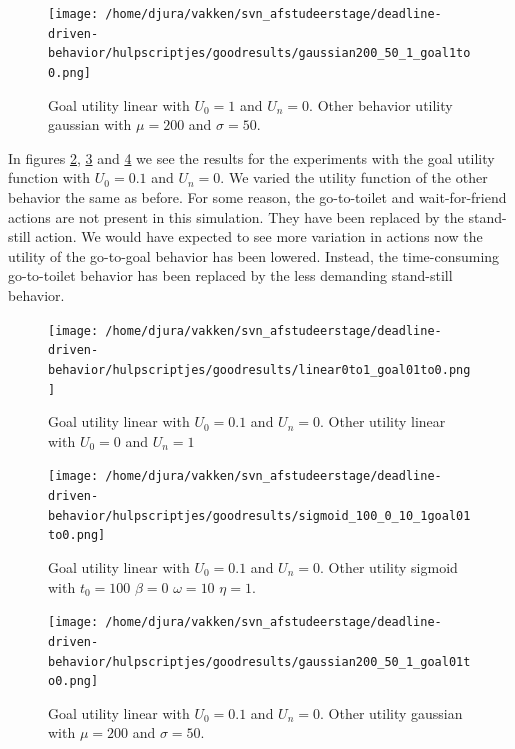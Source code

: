 \documentclass[11pt]{book}
\begin{document}
\begin{figure}[b]
\texttt{[image: /home/djura/vakken/svn\_afstudeerstage/deadline-driven-behavior/hulpscriptjes/goodresults/gaussian200\_50\_1\_goal1to0.png]}
\caption{Goal utility linear with $U_0=1$ and $U_n = 0$. Other behavior utility gaussian with $\mu=200$ and $\sigma=50$.}
\label{fig:gaussian200_50_1_goal1to0}
\end{figure}



In figures \ref{fig:linear0to1_goal01to0}, \ref{fig:sigmoid_100_0_10_1goal01to0} and \ref{fig:gaussian200_50_1_goal01to0} we see the results for the experiments with the goal utility function with $U_0=0.1$ and $U_n=0$. We varied the utility function of the other behavior the same as before. For some reason, the go-to-toilet and wait-for-friend actions are not present in this simulation. They have been replaced by the stand-still action. We would have expected to see more variation in actions now the utility of the go-to-goal behavior has been lowered. Instead, the time-consuming go-to-toilet behavior has been replaced by the less demanding stand-still behavior.

\begin{figure}
\centering
\texttt{[image: /home/djura/vakken/svn\_afstudeerstage/deadline-driven-behavior/hulpscriptjes/goodresults/linear0to1\_goal01to0.png]}
\caption{Goal utility linear with $U_0=0.1$ and $U_n=0$. Other utility linear with $U_0=0$ and $U_n=1$}
\label{fig:linear0to1_goal01to0}
\end{figure}

\begin{figure}
\centering
\texttt{[image: /home/djura/vakken/svn\_afstudeerstage/deadline-driven-behavior/hulpscriptjes/goodresults/sigmoid\_100\_0\_10\_1goal01to0.png]}
\caption{Goal utility linear with $U_0=0.1$ and $U_n=0$. Other utility sigmoid with $t_0=100$ $\beta=0$ $\omega=10$ $\eta=1$.}
\label{fig:sigmoid_100_0_10_1goal01to0}
\end{figure}

\begin{figure}
\centering
\texttt{[image: /home/djura/vakken/svn\_afstudeerstage/deadline-driven-behavior/hulpscriptjes/goodresults/gaussian200\_50\_1\_goal01to0.png]}
\caption{Goal utility linear with $U_0=0.1$ and $U_n=0$. Other utility gaussian with $\mu=200$ and $\sigma=50$.}
\label{fig:gaussian200_50_1_goal01to0}
\end{figure}
\end{document}
